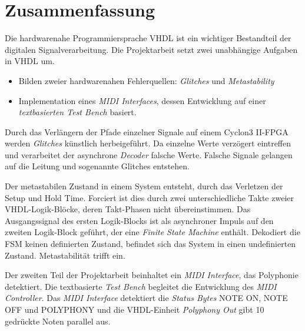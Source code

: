 
\chapter*{Zusammenfassung}


Die hardwarenahe Programmiersprache VHDL ist ein wichtiger Bestandteil der digitalen Signalverarbeitung. Die Projektarbeit setzt zwei unabhängige Aufgaben in VHDL um.

\begin{itemize}
\item Bilden zweier hardwarenahen Fehlerquellen: \textit{Glitches} und \textit{Metastability}
	\item Implementation eines \textit{MIDI Interfaces}, dessen Entwicklung auf einer \textit{textbasierten Test Bench} basiert.
\end{itemize} 

Durch das Verlängern der Pfade einzelner Signale auf einem Cyclon3 II-FPGA werden \textit{Glitches} künstlich herbeigeführt. Da einzelne Werte verzögert eintreffen und verarbeitet der asynchrone \textit{Decoder} falsche Werte. Falsche Signale gelangen auf die Leitung und sogenannte Glitches entstehen. 

Der metastabilen Zustand in einem System entsteht, durch das Verletzen der Setup und Hold Time. Forciert ist dies durch zwei unterschiedliche Takte zweier VHDL-Logik-Blöcke, deren Takt-Phasen nicht übereinstimmen. Das Ausgangssignal des ersten Logik-Blocks ist als asynchroner Impuls auf den zweiten Logik-Block geführt, der eine \textit{Finite State Machine} enthält. Dekodiert die FSM keinen definierten Zustand, befindet sich das System in einen undefinierten Zustand. Metastabilität trifft ein.

Der zweiten Teil der Projektarbeit beinhaltet ein \textit{MIDI Interface}, das Polyphonie detektiert. Die textbasierte \textit{Test Bench} begleitet die Entwicklung des \textit{MIDI Controller}. Das \textit{MIDI Interface} detektiert die \textit{Status Bytes} NOTE ON, NOTE OFF und POLYPHONY und die VHDL-Einheit \textit{Polyphony Out} gibt 10 gedrückte Noten parallel aus.
